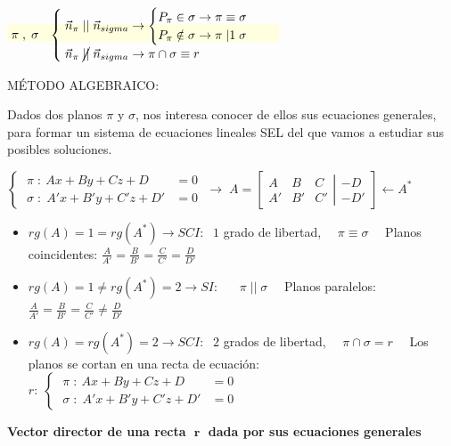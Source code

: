 \centerline{\colorbox{LightYellow}{$\;\pi \;,\; \sigma\:\;\;\begin{cases} 
\; \vec n_{\pi}\;||\; \vec n_{sigma} \to 
	\begin{cases}
	P_{\pi} \in \sigma \to \pi \equiv \sigma 
	\\
	P_{\pi} \notin \sigma \to \pi \;|1\; \sigma 
	\end{cases}
\\
\; \vec n_{\pi}\;\cancel{||}\; \vec n_{sigma} \to \pi \cap \sigma \equiv r
\end{cases}\;$}}
\justify

\noindent MÉTODO ALGEBRAICO:	

Dados dos planos $\pi$ y $\sigma$, nos interesa conocer de ellos sus ecuaciones generales, para formar un sistema de ecuaciones lineales SEL del que vamos a estudiar sus posibles soluciones.

\noindent $\begin{cases} \; \pi \; :\ Ax+By+Cz+D&=0 \\ \; \sigma \; :\; A'x+B'y+C'z+D'&=0 \end{cases} \;\to\; A=\left[ 
\begin{matrix} A&B&C \\ A'&B'&C' \end{matrix}
 \right|
 \left.  
\begin{matrix} -D\\-D' \end{matrix} \right] 
 \leftarrow A^*$

\begin{itemize}
\item $rg(A)=1=rg(A^*) \to SCI:\;$ $1$ grado de libertad,  $\quad \pi\equiv \sigma\quad $ Planos coincidentes: $\frac{A}{A'}=\frac{B}{B'}=\frac{C}{C'}=\frac{D}{D'}$	
\item $rg(A)=1\neq rg(A^*)=2 \to SI:\;$  $\quad \pi \;||\; \sigma \quad $ Planos paralelos: $\frac{A}{A'}=\frac{B}{B'}=\frac{C}{C'}\neq\frac{D}{D'}$
\item $rg(A)=rg(A^*)=2 \to SCI:\;$ $2$ grados de libertad, $\quad \pi \cap \sigma = r \quad $ Los planos se cortan en una recta de ecuación: \\
$r:\; \begin{cases} \; \pi \; :\ Ax+By+Cz+D&=0 \\ \; \sigma \; :\; A'x+B'y+C'z+D'&=0 \end{cases}$ 
\end{itemize}

\noindent \textbf{Vector director de una recta $\;\boldsymbol{ r }\;$ dada por sus ecuaciones generales}

